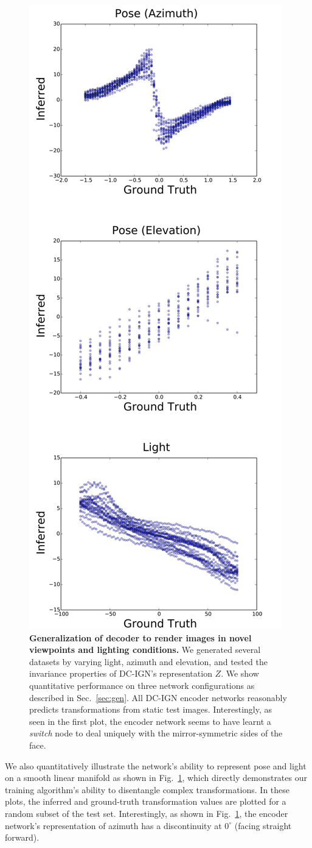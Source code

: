 \documentclass[12pt,twoside]{mitthesis}
\begin{document}
\begin{figure}[htbp]
\centering
\includegraphics[height=0.95000\textwidth]{figures/extrinsic-inference-scatter.png}
\caption{\label{fig:gen}\textbf{Generalization of decoder to render
images in novel viewpoints and lighting conditions.} We generated
several datasets by varying light, azimuth and elevation, and tested the
invariance properties of DC-IGN's representation $Z$. We show
quantitative performance on three network configurations as described in
Sec.~\ref{sec:gen}. All DC-IGN encoder networks reasonably predicts
transformations from static test images. Interestingly, as seen in the
first plot, the encoder network seems to have learnt a \emph{switch}
node to deal uniquely with the mirror-symmetric sides of the face.}
\end{figure}

We also quantitatively illustrate the network's ability to represent
pose and light on a smooth linear manifold as shown in
Fig.~\ref{fig:gen}, which directly demonstrates our training algorithm's
ability to disentangle complex transformations. In these plots, the
inferred and ground-truth transformation values are plotted for a random
subset of the test set. Interestingly, as shown in Fig.~\ref{fig:gen},
the encoder network's representation of azimuth has a discontinuity at
$0^\circ$ (facing straight forward).
\end{document}
